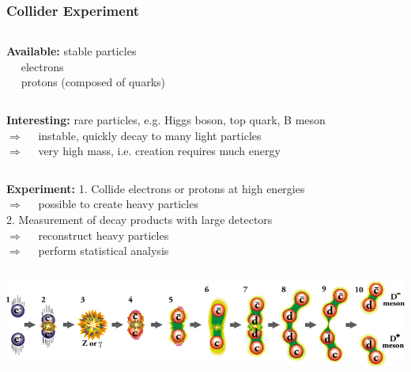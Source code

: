 \documentclass[10pt,t]{beamer}
\begin{document}
\begin{frame}
\frametitle{Collider Experiment}
\vspace*{-2\baselineskip}
\begin{columns}
\textbf{Available:}
stable particles \\
    \qquad\textbullet~~ electrons \\
    \qquad\textbullet~~ protons (composed of quarks)
\end{columns}
\vspace*{1ex}
\begin{columns}
\textbf{Interesting:}
rare particles, e.g. Higgs boson, top quark, B meson \\
    \qquad$\Rightarrow$~~ instable, quickly decay to many light particles \\
    \qquad$\Rightarrow$~~ very high mass, i.e. creation requires much energy
\end{columns}
\vspace*{1ex}
\begin{columns}
\textbf{Experiment:}
1. Collide electrons or protons at high energies \\
    \qquad$\Rightarrow$~~ possible to create heavy particles \\[1ex]
    2. Measurement of decay products with large detectors \\
    \qquad$\Rightarrow$~~ reconstruct heavy particles \\
    \qquad$\Rightarrow$~~ perform statistical analysis
\end{columns}
\vspace*{1ex}
\includegraphics[width=\textwidth]{teilchenphysik-kollision}
\end{frame}
\end{document}
